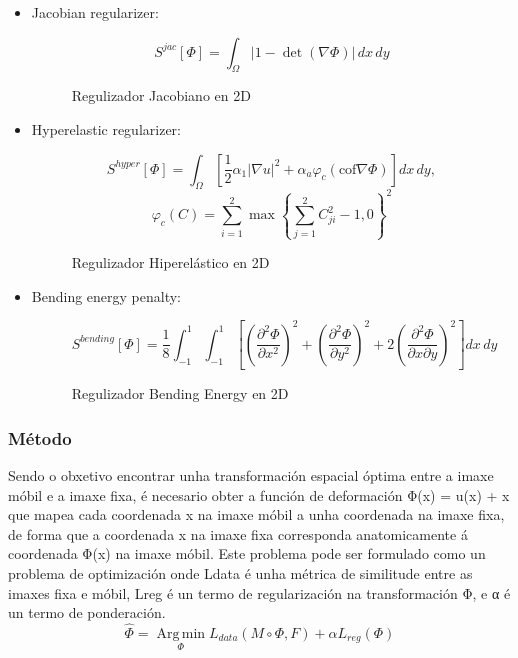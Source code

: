  \begin{itemize}
    \item Jacobian regularizer:
    \begin{figure}[ht!]
        \centering
        \[
        S^{jac}[\Phi] = \int_{\Omega} \left| 1 - \det \left( \nabla \Phi \right) \right| \, dx \, dy
        \]
        \caption{Regulizador Jacobiano en 2D}
    \end{figure}
    
    \item Hyperelastic regularizer:
    \begin{figure}[ht!]
        \centering
        \[
        S^{hyper}[\Phi] = \int_{\Omega} \left[ \frac{1}{2} \alpha_1 |\nabla u|^2 + \alpha_a \varphi_c (\text{cof} \nabla \Phi) \right] dx \, dy,
        \]
        \[
        \varphi_c(C) = \sum_{i=1}^2 \max \left\{ \sum_{j=1}^2 C_{ji}^2 - 1, 0 \right\}^2
        \]
        \caption{Regulizador Hiperelástico en 2D}
    \end{figure}
    
    \item Bending energy penalty:
    \begin{figure}[ht!]
        \centering
        \[
        S^{bending}[\Phi] = \frac{1}{8} \int_{-1}^{1} \int_{-1}^{1} \left[ \left( \frac{\partial^2 \Phi}{\partial x^2} \right)^2 + \left( \frac{\partial^2 \Phi}{\partial y^2} \right)^2 + 2 \left( \frac{\partial^2 \Phi}{\partial x \partial y} \right)^2 \right] dx \, dy
        \]
        \caption{Regulizador Bending Energy en 2D}
    \end{figure}
    
\end{itemize}

\subsubsection{Método}
\label{subsubsec:Método}

Sendo o obxetivo encontrar unha transformación espacial óptima entre a imaxe móbil e a imaxe fixa,
é necesario obter a función de deformación  Φ(x) = u(x) + x que mapea cada coordenada x na imaxe móbil a unha coordenada na imaxe fixa, 
de forma que a coordenada x na imaxe fixa corresponda anatomicamente á coordenada Φ(x) na imaxe móbil.
Este problema pode ser formulado como un problema de optimización onde Ldata é unha métrica de similitude entre as imaxes fixa e móbil, Lreg é un termo de regularización na transformación Φ, e α é un termo de ponderación.
\begin{equation}
   \hat{\Phi} = \operatorname*{Arg\,min}_{\Phi} L_{data}(M \circ \Phi, F) + \alpha L_{reg}(\Phi)
\end{equation}

